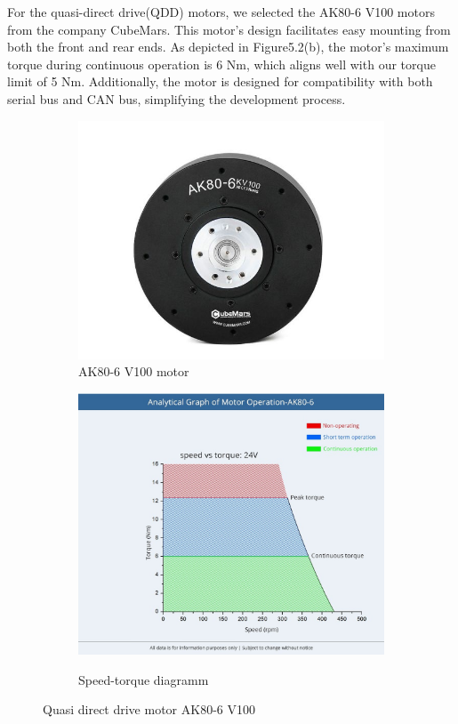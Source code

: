 For the quasi-direct drive(QDD) motors, we selected the AK80-6 V100 motors from the company CubeMars. This motor's design facilitates easy mounting from both the front and rear ends. As depicted in Figure5.2(b), the motor's maximum torque during continuous operation is 6 Nm, which aligns well with our torque limit of 5 Nm. Additionally, the motor is designed for compatibility with both serial bus and CAN bus, simplifying the development process.


\begin{figure}[htbp]
  \centering
  \begin{subfigure}[b]{0.45\textwidth}
    \centering
    \includegraphics[width=\textwidth]{figures/hardware_setup/motor.jpg}
    \caption{AK80-6 V100 motor}
    \label{fig:subfiga}
  \end{subfigure}
  \hfill
  \begin{subfigure}[b]{0.45\textwidth}
    \centering
    \includegraphics[width=\textwidth]{figures/hardware_setup/torque_speed_curve.jpg}
    \label{fig:subfigb}
    \caption{Speed-torque diagramm}
  \end{subfigure}
  \caption{Quasi direct drive motor AK80-6 V100}
  \label{fig:twosubfigures}
\end{figure}

